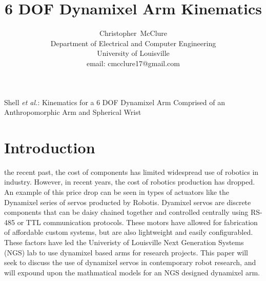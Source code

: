 \documentclass[10pt,journal]{IEEEtran}
\begin{document}
%
{Shell \MakeLowercase{\textit{et al.}}: Kinematics for a 6 DOF Dynamixel Arm Comprised of an Anthropomorphic Arm and Spherical Wrist}

\title{6 DOF Dynamixel Arm Kinematics}
\author{Christopher~McClure\\ Department of Electrical and Computer Engineering\\University of Louisville\\email: cmcclure17@gmail.com}

\maketitle

\IEEEdisplaynontitleabstractindextext


\ifCLASSOPTIONcompsoc
{}
\else
\section{Introduction}
\label{sec:introduction}
\fi

 the recent past, the cost of components has limited widespread use of robotics in industry. However, in recent years, the cost of robotics production has dropped\cite{west2015happens}. An example of this price drop can be seen in types of actuators like the Dynamixel series of servos producted by Robotis\cite{dynamixel}. Dyamixel servos are discrete components that can be daisy chained together and controlled centrally using RS-485 or TTL communication protocols\cite{dynamixelChart}. These motors have allowed for fabrication of affordable custom systems, but are also lightweight and easily configurabled. These factors have led the Univeristy of Louisville Next Generation Systems (NGS) lab to use dynamixel based arms for research projects. This paper will seek to discuss the use of dynamixel servos in contemporary robot research, and will expound upon the mathmatical models for an NGS designed dynamixel arm.
\end{document}
